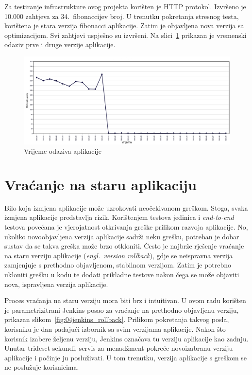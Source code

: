 Za testiranje infrastrukture ovog projekta korišten je HTTP protokol. Izvršeno je 10.000 zahtjeva
za 34.~fibonaccijev broj. U trenutku pokretanja stresnog testa, korištena je stara verzija fibonacci
aplikacije. Zatim je objavljena nova verzija sa optimizacijom. Svi zahtjevi uspješno su izvršeni. Na
slici~\ref{fig:04stresstest} prikazan je vremenski odaziv prve i druge verzije aplikacije.

\begin{figure}[h]
    \centering
    \includegraphics[width=\textwidth]{img/04/response_time.png}
    \caption{Vrijeme odaziva aplikacije}%
    \label{fig:04stresstest}
\end{figure}

\section{Vraćanje na staru aplikaciju}
Bilo koja izmjena aplikacije može uzrokovati neočekivanom greškom. Stoga, svaka izmjena aplikacije
predstavlja rizik. Korištenjem testova jedinica i \textit{end-to-end} testova povećana je
vjerojatnost otkrivanja greške prilikom razvoja aplikacije. No, ukoliko novoobjavljena verzija
aplikacije sadrži neku grešku, potreban je dobar sustav da se takva greška može brzo otkloniti.
Često je najbrže rješenje vraćanje na staru verziju aplikacije (\textit{engl.~version rollback}),
gdje se neispravna verzija zamjenjuje s prethodno objavljenom, stabilnom verzijom. Zatim je potrebno
ukloniti grešku u kodu te dodati prikladne testove nakon čega se može objaviti nova, ispravljena
verzija aplikacije.

Proces vraćanja na staru verziju mora biti brz i intuitivan. U ovom radu korišten je
parametrizitrani Jenkins posao za vraćanje na prethodno objavljenu verziju, prikazan
slikom~\ref{fig:04jenkins_rollback}. Prilikom pokretanja takvog posla, korisniku je dan padajući
izbornik sa svim verzijama aplikacije. Nakon što korisnik izabere željenu verziju, Jenkins označava
tu verziju aplikacije kao zadnju. Unutar trideset sekundi, servis za menadžment pokreće novoizabranu
verziju aplikacije i počinje ju posluživati. U tom trenutku, verzija aplikacije s greškom se ne
poslužuje korisnicima.

